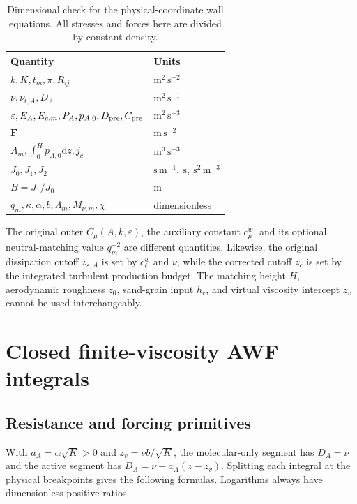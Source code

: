\documentclass[11pt,a4paper]{article}
\numberwithin{equation}{section}
\newcommand{\eps}{\varepsilon}
\newcommand{\dd}{\mathrm d}
\begin{document}
\begin{table}[htbp]
\centering\small
\caption{Dimensional check for the physical-coordinate wall equations.
All stresses and forces here are divided by constant density.}
\begin{tabular}{@{}ll@{}}
\toprule Quantity & Units\\ \midrule
$k,K,t_m,\pi,R_{ij}$ & $\mathrm{m^2\,s^{-2}}$\\
$\nu,\nu_{t,A},D_A$ & $\mathrm{m^2\,s^{-1}}$\\
$\eps,E_A,E_{c,m},P_A,p_{A,0},D_{\rm pre},C_{\rm pre}$
 & $\mathrm{m^2\,s^{-3}}$\\
$\boldsymbol F$ & $\mathrm{m\,s^{-2}}$\\
$A_m,\int_0^H p_{A,0}\dd z,j_c$ & $\mathrm{m^3\,s^{-3}}$\\
$J_0,J_1,J_2$ & $\mathrm{s\,m^{-1}},\ \mathrm{s},\ \mathrm{s^2\,m^{-3}}$\\
$B=J_1/J_0$ & $\mathrm{m}$\\
$q_m,\kappa,\alpha,b,\Lambda_m,M_{\nu,m},\chi$ & dimensionless\\
\bottomrule
\end{tabular}
\end{table}

The original outer $C_\mu(A,k,\eps)$, the auxiliary constant
$c_\mu^w$, and its optional neutral-matching value $q_m^{-2}$
are different quantities. Likewise, the original dissipation cutoff
$z_{\eps,A}$ is set by $c_\ell^w$ and $\nu$, while the corrected
cutoff $z_c$ is set by the integrated turbulent production budget.
The matching height $H$, aerodynamic roughness $z_0$, sand-grain
input $h_r$, and virtual viscosity intercept $z_v$ cannot be used
interchangeably.


\section{Closed finite-viscosity AWF integrals}
\label{app:integrals}

\subsection{Resistance and forcing primitives}

With $a_A=\alpha\sqrt K>0$ and $z_v=\nu b/\sqrt K$, the
molecular-only segment has $D_A=\nu$ and the active segment has
$D_A=\nu+a_A(z-z_v)$. Splitting each integral at the physical
breakpoints gives the following formulas. Logarithms always have
dimensionless positive ratios.
\end{document}
